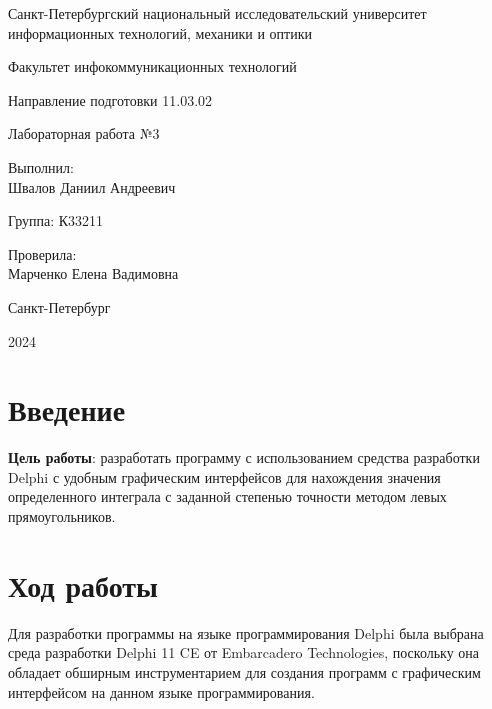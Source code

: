 \documentclass[a4paper, 14pt]{extarticle}
\begin{document}
\begin{titlepage}
  \vspace{0pt plus2fill}
  \noindent

  \vspace{0pt plus6fill}
  \begin{center}
    Санкт-Петербургский национальный исследовательский университет
    информационных технологий, механики и оптики

    \vspace{0pt plus3fill}

    Факультет инфокоммуникационных технологий

    Направление подготовки 11.03.02

    \vspace{0pt plus2fill}

    Лабораторная работа №3
  \end{center}

  \vspace{0pt plus6fill}
  \begin{flushright}
    Выполнил: \\
    Швалов Даниил Андреевич

    Группа: К33211

    Проверила: \\
    Марченко Елена Вадимовна
  \end{flushright}

  \vspace{0pt plus5fill}
  \begin{center}
    Санкт-Петербург

    2024
  \end{center}
\end{titlepage}

\section{Введение}

\textbf{Цель работы}: разработать программу с использованием средства
разработки Delphi с удобным графическим интерфейсов для нахождения значения
определенного интеграла с заданной степенью точности методом левых
прямоугольников.

\section{Ход работы}

Для разработки программы на языке программирования Delphi была выбрана среда
разработки Delphi 11 CE от Embarcadero Technologies, поскольку она обладает
обширным инструментарием для создания программ с графическим интерфейсом на
данном языке программирования.
\end{document}
